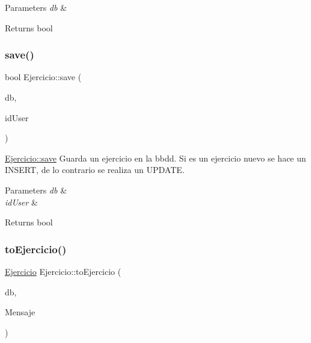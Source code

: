 \begin{DoxyParams}{Parameters}
{\em db} & \\
\hline
\end{DoxyParams}
\begin{DoxyReturn}{Returns}
bool 
\end{DoxyReturn}
\mbox{\label{classEjercicio_a0012834d5116ad4f816e86854c8a54ef}} 
\subsubsection{\texorpdfstring{save()}{save()}}
{\footnotesize\ttfamily bool Ejercicio\+::save (\begin{DoxyParamCaption}\item[{Q\+Sql\+Database}]{db,  }\item[{int}]{id\+User }\end{DoxyParamCaption})}



\mbox{\hyperlink{classEjercicio_a0012834d5116ad4f816e86854c8a54ef}{Ejercicio\+::save}} Guarda un ejercicio en la bbdd. Si es un ejercicio nuevo se hace un I\+N\+S\+E\+RT, de lo contrario se realiza un U\+P\+D\+A\+TE. 


\begin{DoxyParams}{Parameters}
{\em db} & \\
\hline
{\em id\+User} & \\
\hline
\end{DoxyParams}
\begin{DoxyReturn}{Returns}
bool 
\end{DoxyReturn}
\mbox{\label{classEjercicio_a2a96cf1b169835e7fb9546765e11fbc6}} 
\subsubsection{\texorpdfstring{to\+Ejercicio()}{toEjercicio()}}
{\footnotesize\ttfamily \mbox{\hyperlink{classEjercicio}{Ejercicio}} Ejercicio\+::to\+Ejercicio (\begin{DoxyParamCaption}\item[{Q\+Sql\+Database}]{db,  }\item[{J\+S\+ON}]{Mensaje }\end{DoxyParamCaption})}



